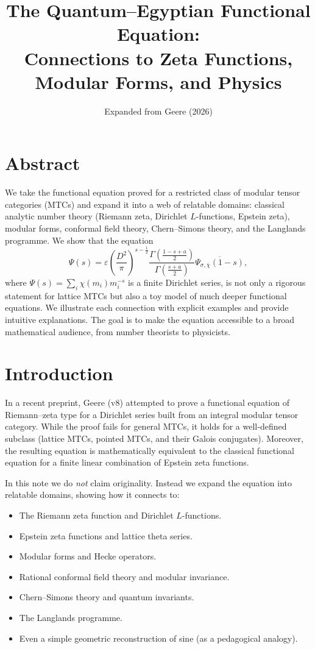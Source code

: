 \documentclass[12pt,a4paper]{article}
\title{The Quantum--Egyptian Functional Equation:\\ Connections to Zeta Functions, Modular Forms, and Physics}
\author{Expanded from Geere (2026)}
\date{}
\theoremstyle{remark}
\begin{document}
\maketitle

\tableofcontents

\newpage

\section{Abstract}

We take the functional equation proved for a restricted class of modular tensor categories (MTCs) and expand it into a web of relatable domains: classical analytic number theory (Riemann zeta, Dirichlet $L$-functions, Epstein zeta), modular forms, conformal field theory, Chern–Simons theory, and the Langlands programme. We show that the equation
\[
\Psi(s)=\varepsilon\left(\frac{D^2}{\pi}\right)^{s-\frac12}
\frac{\Gamma\!\left(\frac{1-s+a}{2}\right)}{\Gamma\!\left(\frac{s+a}{2}\right)}
\overline{\Psi_{\sigma,\overline{\chi}}(1-s)},
\]
where $\Psi(s)=\sum_i \chi(m_i)m_i^{-s}$ is a finite Dirichlet series, is not only a rigorous statement for lattice MTCs but also a toy model of much deeper functional equations. We illustrate each connection with explicit examples and provide intuitive explanations. The goal is to make the equation accessible to a broad mathematical audience, from number theorists to physicists.

\section{Introduction}

In a recent preprint, Geere (v8) attempted to prove a functional equation of Riemann–zeta type for a Dirichlet series built from an integral modular tensor category. While the proof fails for general MTCs, it holds for a well‑defined subclass (lattice MTCs, pointed MTCs, and their Galois conjugates). Moreover, the resulting equation is mathematically equivalent to the classical functional equation for a finite linear combination of Epstein zeta functions. 

In this note we do \emph{not} claim originality. Instead we expand the equation into relatable domains, showing how it connects to:

\begin{itemize}
  \item The Riemann zeta function and Dirichlet $L$-functions.
  \item Epstein zeta functions and lattice theta series.
  \item Modular forms and Hecke operators.
  \item Rational conformal field theory and modular invariance.
  \item Chern–Simons theory and quantum invariants.
  \item The Langlands programme.
  \item Even a simple geometric reconstruction of sine (as a pedagogical analogy).
\end{itemize}
\end{document}
